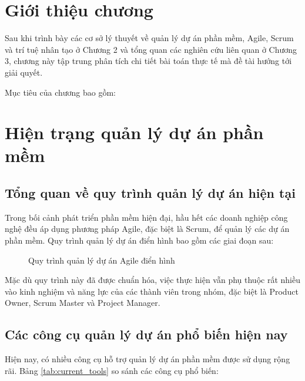 \documentclass[12pt,a4paper]{report}
\begin{document}
\section{Giới thiệu chương}

Sau khi trình bày các cơ sở lý thuyết về quản lý dự án phần mềm, Agile, Scrum và trí tuệ nhân tạo ở Chương 2 và tổng quan các nghiên cứu liên quan ở Chương 3, chương này tập trung phân tích chi tiết bài toán thực tế mà đề tài hướng tới giải quyết.

Mục tiêu của chương bao gồm:
\section{Hiện trạng quản lý dự án phần mềm}

\subsection{Tổng quan về quy trình quản lý dự án hiện tại}

Trong bối cảnh phát triển phần mềm hiện đại, hầu hết các doanh nghiệp công nghệ đều áp dụng phương pháp Agile, đặc biệt là Scrum, để quản lý các dự án phần mềm. Quy trình quản lý dự án điển hình bao gồm các giai đoạn sau:

\begin{figure}[H]
\centering
{}
\caption{Quy trình quản lý dự án Agile điển hình}
\label{fig:current_process}
\end{figure}

Mặc dù quy trình này đã được chuẩn hóa, việc thực hiện vẫn phụ thuộc rất nhiều vào kinh nghiệm và năng lực của các thành viên trong nhóm, đặc biệt là Product Owner, Scrum Master và Project Manager.

\subsection{Các công cụ quản lý dự án phổ biến hiện nay}

Hiện nay, có nhiều công cụ hỗ trợ quản lý dự án phần mềm được sử dụng rộng rãi. Bảng \ref{tab:current_tools} so sánh các công cụ phổ biến:
\end{document}
